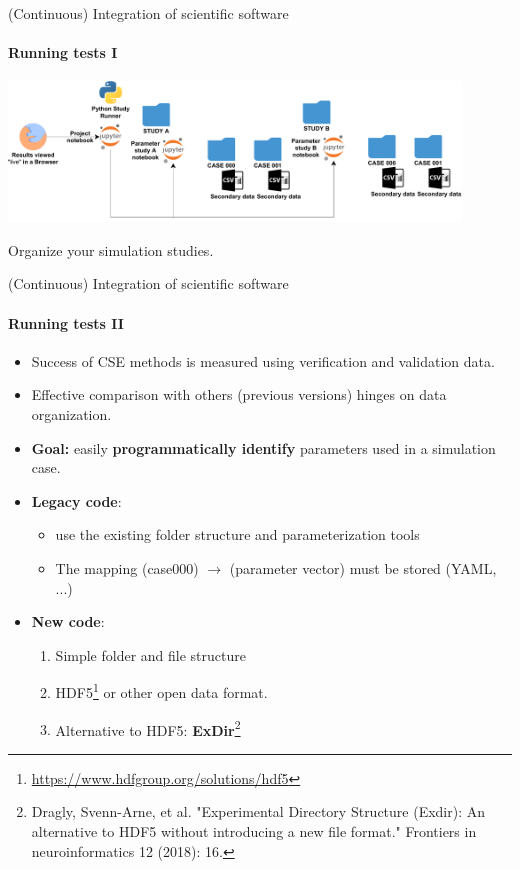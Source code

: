 \begin{frame}{(Continuous) Integration of scientific software} 
\framesubtitle{Running tests I}
\vfill

\begin{center}
    \includegraphics[width=0.9\textwidth]{figures/Cluster-Parameter-Study-Organization.pdf}
\end{center}

Organize your simulation studies.

\end{frame}

\begin{frame}{(Continuous) Integration of scientific software} 
\framesubtitle{Running tests II}
\vfill

    \begin{itemize}
        \item Success of CSE methods is measured using verification and validation data. 
        \item Effective comparison with others (previous versions) hinges on data organization.
        \item \textbf{Goal:} easily \textbf{programmatically identify} parameters used in a simulation case.
    \end{itemize}
    
    \vfill
    \begin{itemize}
        \item \textbf{Legacy code}: 
            \begin{itemize}
                \item use the existing folder structure and parameterization tools %
                \item The mapping (case000) $\to$ (parameter vector) must be stored (YAML, ...)
            \end{itemize}
        \item \textbf{New code}: 
            \begin{enumerate}
                \item Simple folder and file structure %
                \item HDF5\footnote{\url{https://www.hdfgroup.org/solutions/hdf5}} or other open data format.
                \item Alternative to HDF5: \textbf{ExDir}\footnote{Dragly, Svenn-Arne, et al. "Experimental Directory Structure (Exdir): An alternative to HDF5 without introducing a new file format." Frontiers in neuroinformatics 12 (2018): 16.} 
            \end{enumerate}
    \end{itemize}

\end{frame}


